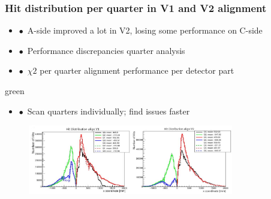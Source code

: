 \documentclass[aspectratio=1610, 12pt, xcolor=dvipsnames]{beamer}
\begin{document}
\begin{frame}\frametitle{Hit distribution per quarter in V1 and V2 alignment}
  \begin{itemize}
    \item $\bullet$\, A-side improved a lot in V2, losing some performance on C-side
    \item $\bullet$\, Performance discrepancies \to quarter analysis
    \item $\bullet$\, $\chi2$ per quarter \to alignment performance per detector part
  \end{itemize}
  \begin{mybox}{green}{}
    \begin{itemize}
      \item $\bullet$\, Scan quarters individually; find issues faster
    \end{itemize}
  \end{mybox}
  \begin{figure}
      \includegraphics[width=0.8\textwidth]{logos/v1_v2.png}%
  \end{figure}
\end{frame}
\end{document}
